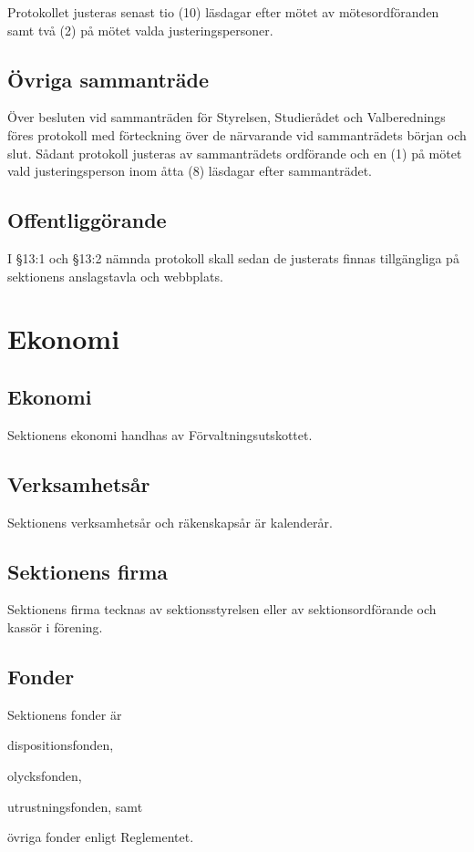 \documentclass[10pt]{article}
\begin{document}
    Protokollet justeras senast tio (10) läsdagar efter mötet av
    mötesordföranden samt två (2) på mötet valda justeringspersoner.
    
    \subsection{Övriga sammanträde}
    Över besluten vid sammanträden för Styrelsen, Studierådet och
    Valberednings föres protokoll med förteckning över de närvarande vid
    sammanträdets början och slut.
    Sådant protokoll justeras av sammanträdets ordförande och en (1) på mötet
    vald justeringsperson inom åtta (8) läsdagar efter sammanträdet.
    
    \subsection{Offentliggörande}
    I §13:1 och §13:2 nämnda protokoll skall sedan de justerats finnas
    tillgängliga på sektionens anslagstavla och webbplats.
    \newpage
    
    \section{Ekonomi}
    \subsection{Ekonomi}
    Sektionens ekonomi handhas av Förvaltningsutskottet.
    
    \subsection{Verksamhetsår}
    Sektionens verksamhetsår och räkenskapsår är kalenderår.
    
    \subsection{Sektionens firma}
    Sektionens firma tecknas av sektionsstyrelsen eller av sektionsordförande och kassör i förening.
    
    \subsection{Fonder}
    Sektionens fonder är
    \begin{alphlist}
    \item dispositionsfonden,
    \item olycksfonden,
    \item utrustningsfonden, samt
    \item övriga fonder enligt Reglementet.
    \end{alphlist}
    
\end{document}
